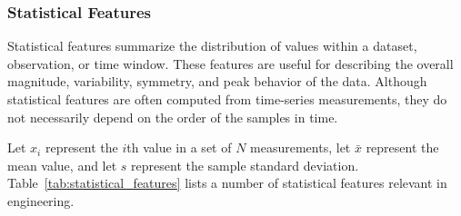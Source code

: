 \documentclass[12pt,letter]{article}
\begin{document}
\subsubsection{Statistical Features}

Statistical features summarize the distribution of values within a dataset, observation, or time window. These features are useful for describing the overall magnitude, variability, symmetry, and peak behavior of the data. Although statistical features are often computed from time-series measurements, they do not necessarily depend on the order of the samples in time.

Let \(x_i\) represent the \(i\)th value in a set of \(N\) measurements, let \(\bar{x}\) represent the mean value, and let \(s\) represent the sample standard deviation. Table~\ref{tab:statistical_features} lists a number of statistical features relevant in engineering. 
\end{document}
